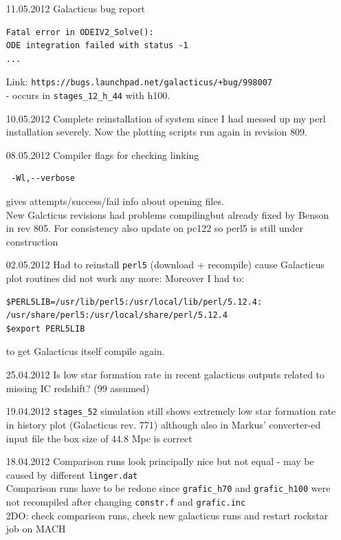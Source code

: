 \documentclass[a4paper,11pt,fleqn,oneside]{book}
\begin{document}
\begin{itemize}
\item[11.05.2012]
Galacticus bug report 
\begin{verbatim}
Fatal error in ODEIV2_Solve():
ODE integration failed with status -1
...
\end{verbatim}
Link: \texttt{https://bugs.launchpad.net/galacticus/+bug/998007} \\ - 
occurs in \texttt{stages\_12\_h\_44} with h100. 

\item[10.05.2012]
Complete reinstallation of system since I had messed up my perl installation 
severely. Now the plotting scripts run again in revision 809. 

\item[08.05.2012]
Compiler flags for checking linking 
\begin{verbatim}
 -Wl,--verbose
\end{verbatim}
gives attempts/success/fail info about opening files. \\
New Galcticus revisions had problems compilingbut already 
fixed by Benson in rev 805. For consistency also update 
on pc122 so perl5 is still under construction \\

\item[02.05.2012]
Had to reinstall \texttt{perl5} (download + recompile) 
cause Galacticus plot routines did not work any more: 
Moreover I had to: 
\begin{verbatim}
$PERL5LIB=/usr/lib/perl5:/usr/local/lib/perl/5.12.4:
/usr/share/perl5:/usr/local/share/perl/5.12.4
$export PERL5LIB
\end{verbatim}
to get Galacticus itself compile again. \\

\item[25.04.2012]
Is low star formation rate in recent galacticus outputs 
related to missing IC redshift? (99 assumed) \\

\item[19.04.2012]
\texttt{stages\_52} simulation still shows extremely low 
star formation rate in history plot (Galacticus rev. 771) 
although also in Markus' converter-ed input file the box 
size of 44.8 Mpc is correct \\ 


\item[18.04.2012]
Comparison runs look principally nice but not equal - may be 
caused by different \texttt{linger.dat} \\
Comparison runs have to be redone since \texttt{grafic\_h70}
and \texttt{grafic\_h100} were 
not recompiled after changing \texttt{constr.f} and \texttt{grafic.inc} \\
2DO: check comparison runs, check new galacticus runs and 
restart rockstar job on MACH \\


\end{itemize}
\end{document}

